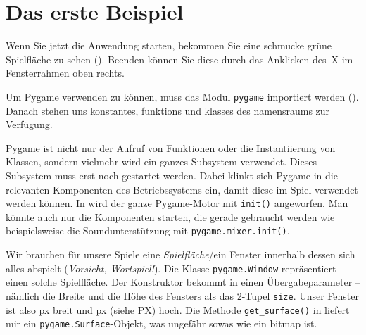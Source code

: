 \section{Das erste Beispiel}


\begin{figure}
    \vspace{-1em}
\end{figure}
Wenn Sie jetzt die Anwendung starten, bekommen Sie eine schmucke grüne Spielfläche zu sehen (). Beenden können Sie diese durch das Anklicken des~X im Fensterrahmen oben rechts.


Um Pygame verwenden zu können, muss das Modul \texttt{pygame} importiert werden (). Danach stehen uns \glspl{konstante}, \glspl{funktion} und \glspl{klasse} des \Gls{namensraum}s zur Verfügung. 

Pygame ist nicht nur der Aufruf von Funktionen oder die Instantiierung von Klassen, sondern vielmehr wird ein ganzes Subsystem verwendet. Dieses Subsystem muss erst noch gestartet werden. Dabei klinkt sich Pygame in die relevanten Komponenten des Betriebssystems ein, damit diese im Spiel verwendet werden können. In  wird der ganze Pygame-Motor mit \texttt{init()} angeworfen. Man könnte auch nur die Komponenten starten, die gerade gebraucht werden wie beispielsweise die Soundunterstützung mit \texttt{pygame.mixer.init()}.

Wir brauchen für unsere Spiele eine \emph{Spielfläche}/ein Fenster innerhalb dessen sich alles abspielt (\emph{Vorsicht, Wortspiel!}). Die Klasse \texttt{pygame.Window} repräsentiert einen solche Spielfläche. Der Konstruktor bekommt in  einen Übergabeparameter -- nämlich die Breite und die Höhe des Fensters als das 2-Tupel \texttt{size}. Unser Fenster ist also \unit[600]{px} breit und \unit[400]{px} (siehe \Gls{PX}) hoch. Die Methode \texttt{get\_surface()}  in  liefert mir ein \texttt{pygame.Surface}-Objekt, was ungefähr sowas wie ein \Gls{bitmap} ist. 

